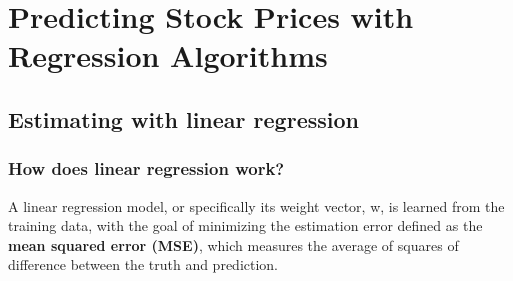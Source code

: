 \chapter{Predicting Stock Prices with Regression Algorithms\label{Ch07}}
\section{Estimating with linear regression}
\subsection{How does linear regression work?}
A linear regression model, or specifically its weight vector, w, is learned from the training data, with the goal of minimizing the estimation error defined as the \textbf{mean squared error (MSE)}, which measures the average of squares of difference between the truth and prediction.